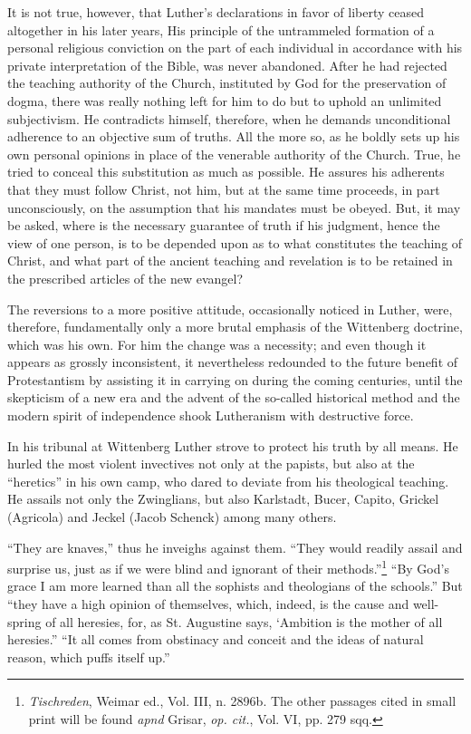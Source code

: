 It is not true, however, that Luther’s declarations in favor of liberty
ceased altogether in his later years, His principle of the untrammeled
formation of a personal religious conviction on the part of
each individual in accordance with his private interpretation of the
Bible, was never abandoned. After he had rejected the teaching
authority of the Church, instituted by God for the preservation of
dogma, there was really nothing left for him to do but to uphold
an unlimited subjectivism. He contradicts himself, therefore, when he
demands unconditional adherence to an objective sum of truths. All
the more so, as he boldly sets up his own personal opinions in place of
the venerable authority of the Church. True, he tried to conceal this
substitution as much as possible. He assures his adherents that they
must follow Christ, not him, but at the same time proceeds, in part
unconsciously, on the assumption that his mandates must be obeyed.
But, it may be asked, where is the necessary guarantee of truth if his
judgment, hence the view of one person, is to be depended upon as to
what constitutes the teaching of Christ, and what part of the ancient
teaching and revelation is to be retained in the prescribed articles of
the new evangel?

The reversions to a more positive attitude, occasionally noticed
in Luther, were, therefore, fundamentally only a more brutal emphasis
of the Wittenberg doctrine, which was his own. For him the change
was a necessity; and even though it appears as grossly inconsistent, it
nevertheless redounded to the future benefit of Protestantism by
assisting it in carrying on during the coming centuries, until the
skepticism of a new era and the advent of the so-called historical
method and the modern spirit of independence shook Lutheranism
with destructive force.

In his tribunal at Wittenberg Luther strove to protect his truth
by all means. He hurled the most violent invectives not only at the
papists, but also at the “heretics” in his own camp, who dared to
deviate from his theological teaching. He assails not only the Zwinglians,
but also Karlstadt, Bucer, Capito, Grickel (Agricola) and Jeckel
(Jacob Schenck) among many others.

“They are knaves,” thus he inveighs against them. “They would readily
assail and surprise us, just as if we were blind and ignorant of their
methods.”\footnote
{\textit{Tischreden}, Weimar ed., Vol. III, n. 2896b. The other passages cited in small print
will be found \textit{apnd} Grisar, \textit{op. cit.}, Vol. VI, pp. 279 sqq.}
“By God’s grace I am more learned than all the sophists and
theologians of the schools.” But “they have a high opinion of themselves,
which, indeed, is the cause and well-spring of all heresies, for, as St. Augustine
says, ‘Ambition is the mother of all heresies.” “It all comes from obstinacy
and conceit and the ideas of natural reason, which puffs itself up.”

